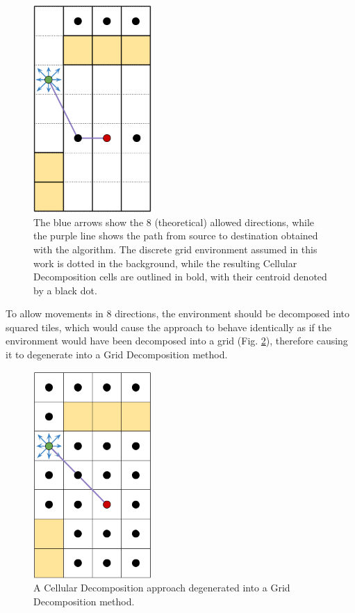 \documentclass[conference]{IEEEtran}
\begin{document}
\begin{figure}[]
	\includegraphics[width=4.5cm]{cell_decomposition_directions.png}
	\centering
	\caption{The blue arrows show the 8 (theoretical) allowed directions, while the purple line shows the path from source to destination obtained with the algorithm. The discrete grid environment assumed in this work is dotted in the background, while the resulting Cellular Decomposition cells are outlined in bold, with their centroid denoted by a black dot.}
	\label{fig:cellDecompositionAllowedDirections}
\end{figure}

To allow movements in 8 directions, the environment should be decomposed into squared tiles, which would cause the approach to behave identically as if the environment would have been decomposed into a grid (Fig. \ref{fig:cellDecompositionAllowedDirectionsGrid}), therefore causing it to degenerate into a Grid Decomposition method.

\begin{figure}[]
	\includegraphics[width=4.5cm]{cell_decomposition_directions_grid.png}
	\centering
	\caption{A Cellular Decomposition approach degenerated into a Grid Decomposition method.}
	\label{fig:cellDecompositionAllowedDirectionsGrid}
\end{figure}
\end{document}
